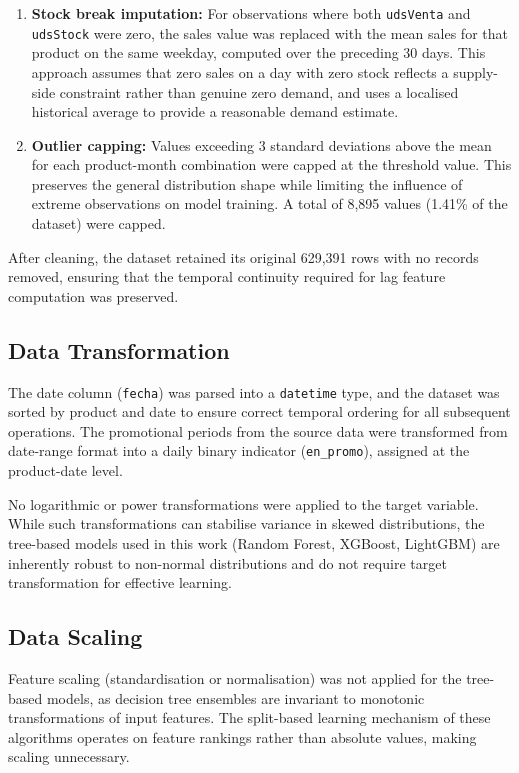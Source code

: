 \begin{enumerate}
    \item \textbf{Stock break imputation:} For observations where both \texttt{udsVenta} and \texttt{udsStock} were zero, the sales value was replaced with the mean sales for that product on the same weekday, computed over the preceding 30 days. This approach assumes that zero sales on a day with zero stock reflects a supply-side constraint rather than genuine zero demand, and uses a localised historical average to provide a reasonable demand estimate.

    \item \textbf{Outlier capping:} Values exceeding 3 standard deviations above the mean for each product-month combination were capped at the threshold value. This preserves the general distribution shape while limiting the influence of extreme observations on model training. A total of 8,895 values (1.41\% of the dataset) were capped.
\end{enumerate}

After cleaning, the dataset retained its original 629,391 rows with no records removed, ensuring that the temporal continuity required for lag feature computation was preserved.

\subsection{Data Transformation}

The date column (\texttt{fecha}) was parsed into a \texttt{datetime} type, and the dataset was sorted by product and date to ensure correct temporal ordering for all subsequent operations. The promotional periods from the source data were transformed from date-range format into a daily binary indicator (\texttt{en\_promo}), assigned at the product-date level.

No logarithmic or power transformations were applied to the target variable. While such transformations can stabilise variance in skewed distributions, the tree-based models used in this work (Random Forest, XGBoost, LightGBM) are inherently robust to non-normal distributions and do not require target transformation for effective learning.

\subsection{Data Scaling}

Feature scaling (standardisation or normalisation) was not applied for the tree-based models, as decision tree ensembles are invariant to monotonic transformations of input features. The split-based learning mechanism of these algorithms operates on feature rankings rather than absolute values, making scaling unnecessary.

